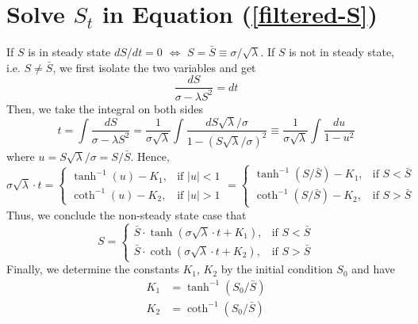 \documentclass[a4paper, 11pt]{article}
\theoremstyle{plain} %
\begin{document}





\section{Solve $S_t$ in Equation (\ref{filtered-S})}\label{app-S-equ}

If $S$ is in steady state $dS/dt = 0$ $\Leftrightarrow$ $S = \bar{S} \equiv \sigma/\sqrt{\lambda}$. 
If $S$ is not in steady state, i.e. $S\not=\bar{S}$, we first isolate the two variables and get 
\begin{equation*}
	\frac{dS}{\sigma-\lambda S^2} = dt
\end{equation*}
Then, we take the integral on both sides
\begin{equation*}
    t = \int \frac{dS}{\sigma-\lambda S^2} = \frac{1}{\sigma\sqrt{\lambda}} \int \frac{dS\sqrt{\lambda}/\sigma}{1 - (S\sqrt{\lambda}/\sigma)^2} \equiv \frac{1}{\sigma\sqrt{\lambda}}\int \frac{du}{1-u^2} 
\end{equation*}
where $u = S\sqrt{\lambda}/\sigma = S/\bar{S}$. Hence, 
\begin{equation*}
    \sigma\sqrt{\lambda}\cdot t = \begin{cases}
        \tanh^{-1}(u)-K_1, & \text{if } |u|<1\\
        \coth^{-1}(u)-K_2, & \text{if } |u|>1
    \end{cases} = \begin{cases}
        \tanh^{-1}(S/\bar{S})-K_1, & \text{if } S<\bar{S}\\
        \coth^{-1}(S/\bar{S})-K_2, & \text{if } S>\bar{S} 
\end{cases}
\end{equation*}
Thus, we conclude the non-steady state case that 
\begin{equation*}
	S = \begin{cases}
		\bar{S}\cdot\tanh(\sigma\sqrt{\lambda}\cdot t + K_1), & \text{if } S<\bar{S}\\
		\bar{S}\cdot\coth(\sigma\sqrt{\lambda}\cdot t + K_2), & \text{if } S>\bar{S} 
	\end{cases}
\end{equation*}
Finally, we determine the constants $K_1$, $K_2$ by the initial condition $S_0$ and have 
\begin{align*}
	K_1 &= \tanh^{-1}(S_0/\bar{S})\\
	K_2 &= \coth^{-1}(S_0/\bar{S})
\end{align*}
\end{document}
